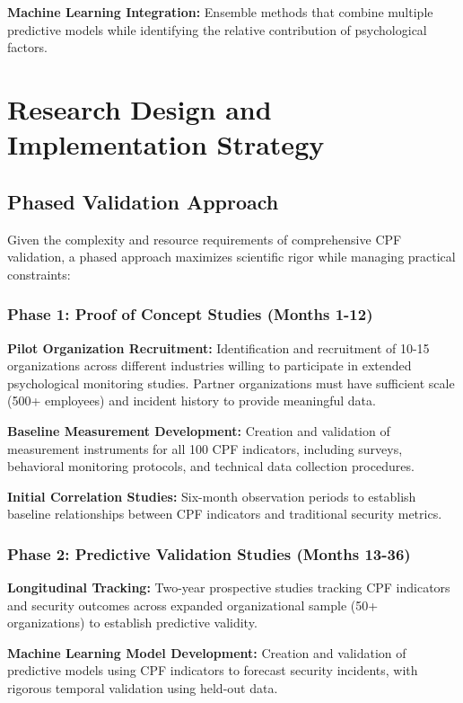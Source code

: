 \documentclass[11pt,a4paper]{article}
\begin{document}
\textbf{Machine Learning Integration:} Ensemble methods that combine multiple predictive models while identifying the relative contribution of psychological factors.

\section{Research Design and Implementation Strategy}

\subsection{Phased Validation Approach}

Given the complexity and resource requirements of comprehensive CPF validation, a phased approach maximizes scientific rigor while managing practical constraints:

\subsubsection{Phase 1: Proof of Concept Studies (Months 1-12)}

\textbf{Pilot Organization Recruitment:} Identification and recruitment of 10-15 organizations across different industries willing to participate in extended psychological monitoring studies. Partner organizations must have sufficient scale (500+ employees) and incident history to provide meaningful data.

\textbf{Baseline Measurement Development:} Creation and validation of measurement instruments for all 100 CPF indicators, including surveys, behavioral monitoring protocols, and technical data collection procedures.

\textbf{Initial Correlation Studies:} Six-month observation periods to establish baseline relationships between CPF indicators and traditional security metrics.

\subsubsection{Phase 2: Predictive Validation Studies (Months 13-36)}

\textbf{Longitudinal Tracking:} Two-year prospective studies tracking CPF indicators and security outcomes across expanded organizational sample (50+ organizations) to establish predictive validity.

\textbf{Machine Learning Model Development:} Creation and validation of predictive models using CPF indicators to forecast security incidents, with rigorous temporal validation using held-out data.
\end{document}
